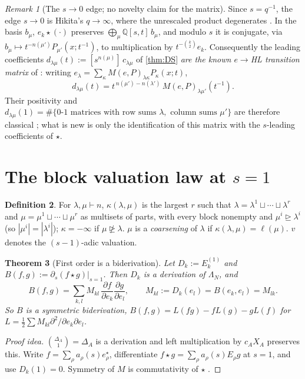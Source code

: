 \documentclass[submission]{FPSAC2027}
\newtheorem{theorem}{Theorem}[section]
\theoremstyle{definition}
\newtheorem{definition}[theorem]{Definition}
\theoremstyle{remark}
\newtheorem{remark}[theorem]{Remark}
\newcommand{\val}{v}
\newcommand{\Lam}{\Lambda}
\begin{document}
\begin{remark}[The $s\to0$ edge; no novelty claim for the matrix]\label{rem:H}
Since $s=q^{-1}$, the edge $s\to0$ is Hikita's $q\to\infty$, where the unrescaled product degenerates \cite[Lemma~6.3]{Hikita25}. In the basis $b_\mu$, $e_k\star(\cdot)$ preserves $\bigoplus_\mu\mathbb{Q}[s,t]\,b_\mu$, and modulo $s$ it is conjugate, via $b_\mu\mapsto t^{-n(\mu')}P_{\mu'}(x;t^{-1})$, to multiplication by $t^{-\binom k2}e_k$. Consequently the leading coefficients $d_{\lambda\mu}(t):=[s^{n(\mu)}]\,c_{\lambda\mu}$ of \cref{thm:DS} \emph{are the known $e\to$HL transition matrix} of \cite[\S3.2]{Kirillov98}: writing $e_\lambda=\sum_\kappa M(e,P)_{\lambda\kappa}P_\kappa(x;t)$,
\[ d_{\lambda\mu}(t)=t^{\,n(\mu')-n(\lambda')}\,M(e,P)_{\lambda\mu'}(t^{-1}). \]
Their positivity and $d_{\lambda\mu}(1)=\#\{0\text{-}1\text{ matrices with row sums }\lambda,\text{ column sums }\mu'\}$ are therefore classical \cite[\S3.2]{Kirillov98}; what is new is only the identification of this matrix with the $s$-leading coefficients of $\star$.
\end{remark}

\section{The block valuation law at $s=1$}\label{sec:blocklaw}

\begin{definition}
For $\lambda,\mu\vdash n$, $\kappa(\lambda,\mu)$ is the largest $r$ such that $\lambda=\lambda^1\sqcup\cdots\sqcup\lambda^r$ and $\mu=\mu^1\sqcup\cdots\sqcup\mu^r$ as multisets of parts, with every block nonempty and $\mu^i\trianglerighteq\lambda^i$ (so $|\mu^i|=|\lambda^i|$); $\kappa=-\infty$ if $\mu\not\trianglerighteq\lambda$. $\mu$ is a \emph{coarsening} of $\lambda$ if $\kappa(\lambda,\mu)=\ell(\mu)$. $\val$ denotes the $(s-1)$-adic valuation.
\end{definition}

\begin{theorem}[First order is a biderivation]\label{thm:bider}
Let $D_k:=E_k^{(1)}$ and $B(f,g):=\partial_s(f\star g)|_{s=1}$. Then $D_k$ is a derivation of $\Lam_N$, and
\[ B(f,g)=\sum_{k,l}M_{kl}\,\frac{\partial f}{\partial e_k}\frac{\partial g}{\partial e_l},\qquad M_{kl}:=D_k(e_l)=B(e_k,e_l)=M_{lk}. \]
So $B$ is a symmetric biderivation, $B(f,g)=L(fg)-fL(g)-gL(f)$ for $L=\frac12\sum M_{kl}\partial^2/\partial e_k\partial e_l$.
\end{theorem}
\begin{proof}[Proof idea]
$\binom{\Delta_A}{1}=\Delta_A$ is a derivation and left multiplication by $c_AX_A$ preserves this. Write $f=\sum_\rho a_\rho(s)e^\star_\rho$, differentiate $f\star g=\sum_\rho a_\rho(s)E_\rho g$ at $s=1$, and use $D_k(1)=0$. Symmetry of $M$ is commutativity of $\star$ \cite{Hikita25}.
\end{proof}
\end{document}
